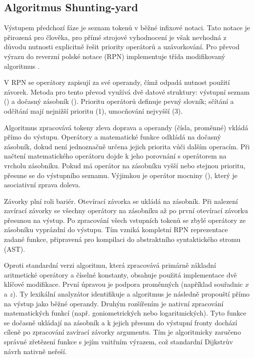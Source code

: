 \documentclass[czech, kiv, sem, he, iso690alph, pdf,viewonly]{fasthesis}
\begin{document}
\subsection{Algoritmus Shunting-yard}
Výstupem předchozí fáze je seznam tokenů v běžné infixové notaci. Tato notace je přirozená pro člověka, pro přímé strojové vyhodnocení je však nevhodná z důvodu nutnosti explicitně řešit priority 
operátorů a uzávorkování. Pro převod výrazu do reverzní polské notace (RPN) implementuje třída  modifikovaný algoritmus  \cite{dijkstra_shunting_yard}.

V RPN se operátory zapisují za své operandy, čímž odpadá nutnost použití závorek. 
Metoda  pro tento převod využívá dvě datové struktury: výstupní seznam () a dočasný zásobník (). 
Prioritu operátorů definuje pevný slovník; sčítání a odčítání mají nejnižší prioritu (1), umocňování nejvyšší (3).

Algoritmus zpracovává tokeny zleva doprava a operandy (čísla, proměnné) vkládá přímo do výstupu. Operátory a matematické funkce odkládá na dočasný zásobník, 
dokud není jednoznačně určena jejich priorita vůči dalším operacím. Při načtení matematického operátoru dojde k jeho porovnání s operátorem na vrcholu zásobníku. 
Pokud má operátor na zásobníku vyšší nebo stejnou prioritu, přesune se do výstupního seznamu. Výjimkou je operátor mocniny (\command{\^}), který je asociativní zprava doleva.

Závorky plní roli bariér. Otevírací závorka se ukládá na zásobník. Při nalezení zavírací závorky se všechny operátory na zásobníku až po první otevírací závorku přesunou na výstup. 
Po zpracování všech vstupních tokenů se zbylé operátory ze zásobníku vyprázdní do výstupu. Tím vzniká kompletní RPN reprezentace zadané funkce, připravená pro kompilaci do abstraktního syntaktického stromu (AST).

Oproti standardní verzi algoritmu, která zpracovává primárně základní aritmetické operátory a číselné konstanty, obsahuje použitá implementace dvě klíčové modifikace. 
První úpravou je podpora proměnných (například souřadnic $x$ a $z$). Ty lexikální analyzátor identifikuje a algoritmus je následně propouští přímo na výstup jako běžné operandy. 
Druhým rozšířením je nativní zpracování matematických funkcí (např. goniometrických nebo logaritmických). 
Tyto funkce se dočasně ukládají na zásobník a k jejich přesunu do výstupní fronty dochází cíleně po zpracování zavírací závorky argumentu. 
Tím je algoritmicky zaručeno správné zřetězení funkce s jejím vnitřním výrazem, což standardní Dijkstrův návrh nativně neřeší.
\end{document}
